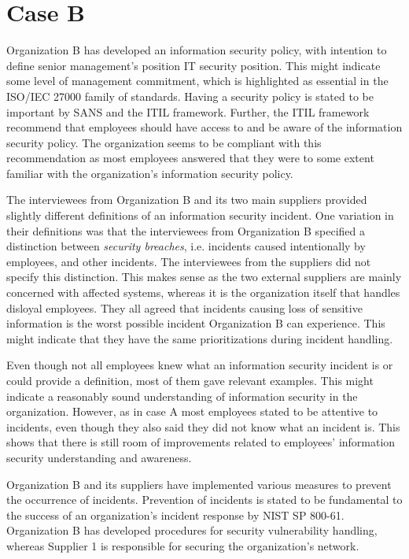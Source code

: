 \section{Case B}
\label{sec:discussionCaseB}
Organization B has developed an information security policy, with intention to define senior management's position IT security position. This might indicate some level of management commitment, which is highlighted as essential in the ISO/IEC 27000 family of standards. Having a security policy is stated to be important by SANS and the ITIL framework. Further, the ITIL framework recommend that employees should have access to and be aware of the information security policy. The organization seems to be compliant with this recommendation as most employees answered that they were to some extent familiar with the organization's information security policy. 

The interviewees from Organization B and its two main suppliers provided slightly different definitions of an information security incident. One variation in their definitions was that the interviewees from Organization B specified a distinction between \textit{security breaches}, i.e. incidents caused intentionally by employees, and other incidents. The interviewees from the suppliers did not specify this distinction. This makes sense as the two external suppliers are mainly concerned with affected systems, whereas it is the organization itself that handles disloyal employees. They all agreed that incidents causing loss of sensitive information is the worst possible incident Organization B can experience. This might indicate that they have the same prioritizations during incident handling.

Even though not all employees knew what an information security incident is or could provide a definition, most of them gave relevant examples. This might indicate a reasonably sound understanding of information security in the organization. However, as in case A most employees stated to be attentive to incidents, even though they also said they did not know what an incident is. This shows that there is still room of improvements related to employees' information security understanding and awareness.

Organization B and its suppliers have implemented various measures to prevent the occurrence of incidents. Prevention of incidents is stated to be fundamental to the success of an organization's incident response by NIST SP 800-61. Organization B has developed procedures for security vulnerability handling, whereas Supplier 1 is responsible for securing the organization's network.  

